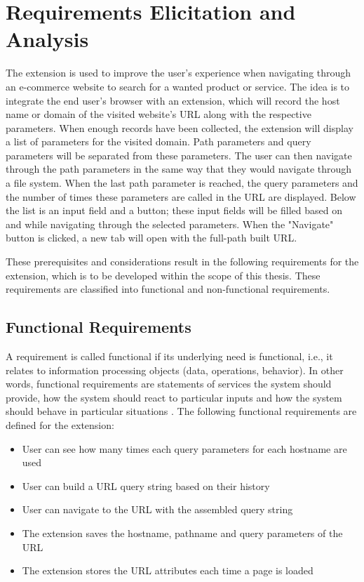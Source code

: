 \section{Requirements Elicitation and Analysis}
\label{requirements_analysis}
The extension is used to improve the user's experience when navigating through an e-commerce website to search for a wanted product or service. The idea is to integrate the end user's browser with an extension, which will record the host name or domain of the visited website's URL along with the respective parameters. When enough records have been collected, the extension will display a list of parameters for the visited domain. Path parameters and query parameters will be separated from these parameters. The user can then navigate through the path parameters in the same way that they would navigate through a file system. When the last path parameter is reached, the query parameters and the number of times these parameters are called in the URL are displayed. Below the list is an input field and a button; these input fields will be filled based on and while navigating through the selected parameters. When the "Navigate" button is clicked, a new tab will open with the full-path built URL.

These prerequisites and considerations result in the following requirements for the extension, which is to be developed within the scope of this thesis. These requirements are classified into functional and non-functional requirements.

\subsection{Functional Requirements}
A requirement is called functional if its underlying need is functional, i.e., it relates to information processing objects (data, operations, behavior). In other words, functional requirements are statements of services the system should provide, how the system should react to particular inputs and how the system should behave in particular situations \autocite{sommerville2011software}. The following functional requirements are defined for the extension:

\begin{itemize}
  \item User can see how many times each query parameters for each hostname are used
  \item User can build a URL query string based on their history
  \item User can navigate to the URL with the assembled query string
  \item The extension saves the hostname, pathname and query parameters of the URL
  \item The extension stores the URL attributes each time a page is loaded
\end{itemize}

